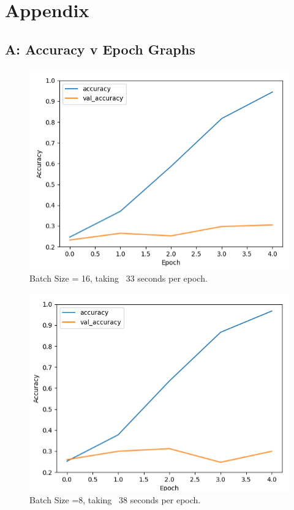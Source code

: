 \section{Appendix}
\label{Appendix Section}

\subsection{A: Accuracy v Epoch Graphs}
\begin{figure}[H]
\centering
\includegraphics[scale=1.0]{Media/Testing/fig1.png}
\caption{Batch Size = 16, taking ~33 seconds per epoch.}
\label{fig1}
\end{figure}

\begin{figure}[H]
\centering
\includegraphics[scale=1.0]{Media/Testing/fig2.png}
\caption{Batch Size =8, taking ~38 seconds per epoch.}
\label{fig2}
\end{figure}

